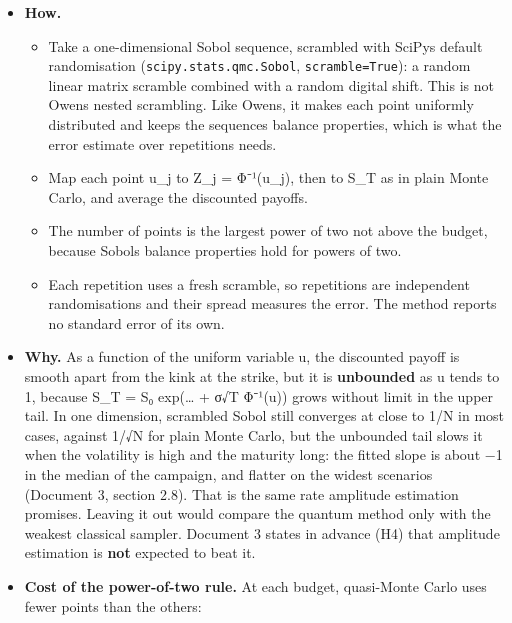 \documentclass[
  10pt,
]{article}
\providecommand{\tightlist}{%
  \setlength{\itemsep}{0pt}\setlength{\parskip}{0pt}}
\begin{document}
\begin{itemize}
\item
  \textbf{How.}

  \begin{itemize}
  \tightlist
  \item
    Take a one-dimensional Sobol sequence, scrambled with
    SciPy\textquotesingle s default randomisation
    (\texttt{scipy.stats.qmc.Sobol}, \texttt{scramble=True}): a random
    linear matrix scramble combined with a random digital shift. This is
    not Owen\textquotesingle s nested scrambling. Like
    Owen\textquotesingle s, it makes each point uniformly distributed
    and keeps the sequence\textquotesingle s balance properties, which
    is what the error estimate over repetitions needs.
  \item
    Map each point u\_j to Z\_j = Φ⁻¹(u\_j), then to S\_T as in plain
    Monte Carlo, and average the discounted payoffs.
  \item
    The number of points is the largest power of two not above the
    budget, because Sobol\textquotesingle s balance properties hold for
    powers of two.
  \item
    Each repetition uses a fresh scramble, so repetitions are
    independent randomisations and their spread measures the error. The
    method reports no standard error of its own.
  \end{itemize}
\item
  \textbf{Why.} As a function of the uniform variable u, the discounted
  payoff is smooth apart from the kink at the strike, but it is
  \textbf{unbounded} as u tends to 1, because S\_T = S₀ exp(\ldots{} +
  σ√T Φ⁻¹(u)) grows without limit in the upper tail. In one dimension,
  scrambled Sobol still converges at close to 1/N in most cases, against
  1/√N for plain Monte Carlo, but the unbounded tail slows it when the
  volatility is high and the maturity long: the fitted slope is about −1
  in the median of the campaign, and flatter on the widest scenarios
  (Document 3, section 2.8). That is the same rate amplitude estimation
  promises. Leaving it out would compare the quantum method only with
  the weakest classical sampler. Document 3 states in advance (H4) that
  amplitude estimation is \textbf{not} expected to beat it.
\item
  \textbf{Cost of the power-of-two rule.} At each budget, quasi-Monte
  Carlo uses fewer points than the others:


\end{itemize}
\end{document}
